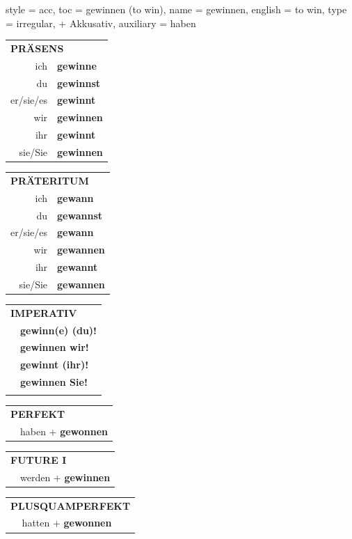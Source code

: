 \begin{verbentry}{
  style = {acc},
  toc = {gewinnen (to win)},
  name = {gewinnen},
  english = {to win},
  type = {irregular, + Akkusativ},
  auxiliary = {haben}
}
  \begin{tabular}{rl}
     \multicolumn{2}{l}{\textbf{PRÄSENS} }\\
    ich & \textbf{gewinne}\\
    du & \textbf{gewinnst}\\
    er/sie/es & \textbf{gewinnt}\\
    wir & \textbf{gewinnen}\\
    ihr & \textbf{gewinnt}\\
    sie/Sie & \textbf{gewinnen}\\
  \end{tabular}
  \hfill
     \begin{tabular}{rl}
    \multicolumn{2}{l}{\textbf{PRÄTERITUM} }\\
    ich & \textbf{gewann}\\
    du & \textbf{gewannst}\\
    er/sie/es & \textbf{gewann}\\
    wir & \textbf{gewannen}\\
    ihr & \textbf{gewannt}\\
    sie/Sie & \textbf{gewannen}\\
  \end{tabular}
  \hfill
  \begin{tabular}{rl}
     \multicolumn{2}{l}{\textbf{IMPERATIV} }\\
   & \textbf{gewinn(e) (du)!}\\
   & \textbf{gewinnen wir!}\\
   & \textbf{gewinnt (ihr)!}\\
   & \textbf{gewinnen Sie!}\\
   & \vspace{10pt}
  \end{tabular}

    \vspace{10pt}

 \begin{tabular}{rl}
     \multicolumn{2}{l}{\textbf{PERFEKT}}\\
  &  haben + \textbf{gewonnen}\\
  \end{tabular}
\hfill
   \begin{tabular}{rl}
   
    \multicolumn{2}{l}{\textbf{FUTURE I} }\\
  &  werden + \textbf{gewinnen}\\
 
  \end{tabular}
\hfill
   \begin{tabular}{rl}
      \multicolumn{2}{l}{\textbf{PLUSQUAMPERFEKT}}\\
  &  hatten + \textbf{gewonnen}\\
  \end{tabular}
  

\end{verbentry}
